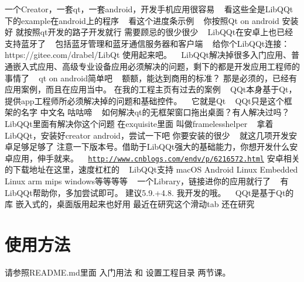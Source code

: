 一个\+Creator，一套qt，一套android，开发手机应用很容易 ~\newline
看这些全是\+Lib\+Q\+Qt下的example在android上的程序 ~\newline
看这个进度条示例 ~\newline
你按照\+Qt on android 安装好 就按照qt开发的路子开发就行 需要顾忌的很少很少 ~\newline
Lib\+Q\+Qt在安卓上也已经支持蓝牙了 ~\newline
包括蓝牙管理和蓝牙通信服务器和客户端 ~\newline
给你个\+Lib\+Q\+Qt连接：https\+://gitee.com/drabel/\+Lib\+Qt 使用起来吧。 ~\newline
Lib\+Q\+Qt解决掉很多入门应用、普通嵌入式应用、高级专业设备应用必须解决的问题，剩下的都是开发应用工程师的事情了 ~\newline
qt on android简单吧 ~\newline
额额，能达到商用的标准？ 那是必须的，已经有应用案例，而且在应用当中。 在我的工程主页有过去的案例 ~\newline
Q\+Qt本身基于\+Qt，提供app工程师所必须解决掉的问题和基础控件。 ~\newline
它就是\+Qt ~\newline
Q\+Qt只是这个框架的名字 中文名 咕咕啼 ~\newline
如何解决qt的无框架窗口拖出桌面？有人解决过吗？ Lib\+Q\+Qt里面有解决你这个问题 在exquisite里面 叫做framelesshelper ~\newline
拿着\+Lib\+Q\+Qt，安装好creator android，尝试一下吧 你要安装的很少 ~\newline
就这几项开发安卓足够足够了 注意一下版本号。借助于\+Lib\+Q\+Qt强大的基础能力，你想开发什么安卓应用，伸手就来。 ~\newline
\href{http://www.cnblogs.com/endv/p/6216572.html}{\tt http\+://www.\+cnblogs.\+com/endv/p/6216572.\+html} 安卓相关的下载地址在这里，速度杠杠的 ~\newline
Lib\+Q\+Qt支持 mac\+OS Android Linux Embedded Linux arm mips windows等等等等 ~\newline
一个\+Library，链接进你的应用就行了 ~\newline
有\+Lib\+Q\+Qt帮助你，多加尝试即可。 建议5.9.+4.8. 我开发的哦。 ~\newline
Q\+Qt是基于\+Qt的库 嵌入式的，桌面版用起来也好用 最近在研究这个滑动tab 还在研究

\section*{使用方法}

请参照\+R\+E\+A\+D\+M\+E.\+md里面 入门用法 和 设置工程目录 两节课。 